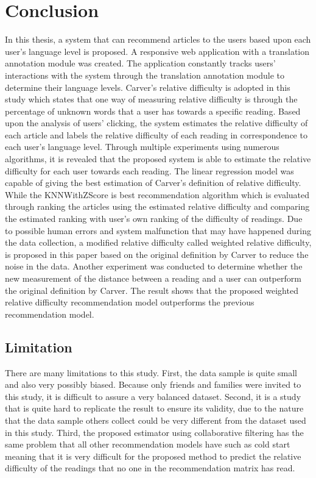 \chapter{Conclusion}

In this thesis, a system that can recommend articles to the users based upon each user's language level is proposed. A responsive web application with a translation annotation module was created. The application constantly tracks users' interactions with the system through the translation annotation module to determine their language levels. Carver's relative difficulty is adopted in this study which states that one way of measuring relative difficulty is through the percentage of unknown words that a user has towards a specific reading. Based upon the analysis of users' clicking, the system estimates the relative difficulty of each article and labels the relative difficulty of each reading in correspondence to each user's language level. Through multiple experiments using numerous algorithms, it is revealed that the proposed system is able to estimate the relative difficulty for each user towards each reading. The linear regression model was capable of giving the best estimation of Carver's definition of relative difficulty. While the KNNWithZScore is best recommendation algorithm which is evaluated through ranking the articles using the estimated relative difficulty and comparing the estimated ranking with user's own ranking of the difficulty of readings. Due to possible human errors and system malfunction that may have happened during the data collection, a modified relative difficulty called weighted relative difficulty, is proposed in this paper based on the original definition by Carver to reduce the noise in the data. Another experiment was conducted to determine whether the new measurement of the distance between a reading and a user can outperform the original definition by Carver. The result shows that the proposed weighted relative difficulty recommendation model outperforms the previous recommendation model. 

\section{Limitation}

There are many limitations to this study. First, the data sample is quite small and also very possibly biased. Because only friends and families were invited to this study, it is difficult to assure a very balanced dataset. Second, it is a study that is quite hard to replicate the result to ensure its validity, due to the nature that the data sample others collect could be very different from the dataset used in this study. Third, the proposed estimator using collaborative filtering has the same problem that all other recommendation models have such as cold start meaning that it is very difficult for the proposed method to predict the relative difficulty of the readings that no one in the recommendation matrix has read. 

